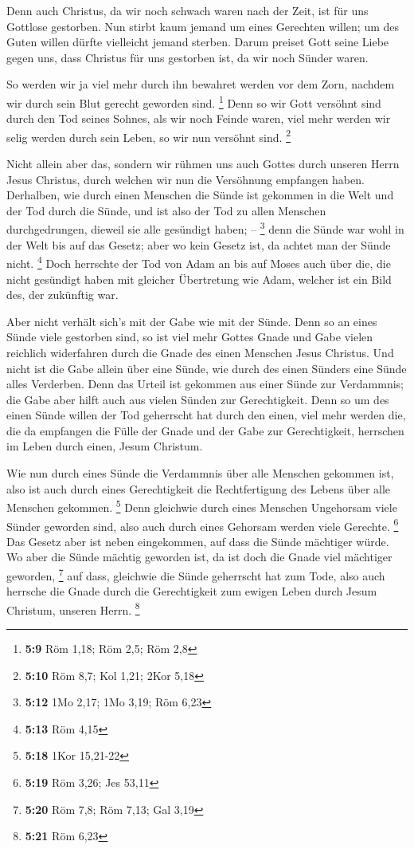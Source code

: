  Denn auch Christus, da wir noch schwach waren nach der
Zeit, ist für uns Gottlose gestorben.  Nun stirbt kaum
jemand um eines Gerechten willen; um des Guten willen dürfte vielleicht
jemand sterben.  Darum preiset Gott seine Liebe gegen uns,
dass Christus für uns gestorben ist, da wir noch Sünder waren.

 So werden wir ja viel mehr durch ihn bewahret werden vor
dem Zorn, nachdem wir durch sein Blut gerecht geworden sind. \footnote{\textbf{5:9}
  Röm 1,18; Röm 2,5; Röm 2,8}  Denn so wir Gott versöhnt
sind durch den Tod seines Sohnes, als wir noch Feinde waren, viel mehr
werden wir selig werden durch sein Leben, so wir nun versöhnt sind.
\footnote{\textbf{5:10} Röm 8,7; Kol 1,21; 2Kor 5,18}

 Nicht allein aber das, sondern wir rühmen uns auch Gottes
durch unseren Herrn Jesus Christus, durch welchen wir nun die Versöhnung
empfangen haben.  Derhalben, wie durch einen Menschen die
Sünde ist gekommen in die Welt und der Tod durch die Sünde, und ist also
der Tod zu allen Menschen durchgedrungen, dieweil sie alle gesündigt
haben; -- \footnote{\textbf{5:12} 1Mo 2,17; 1Mo 3,19; Röm 6,23}
 denn die Sünde war wohl in der Welt bis auf das Gesetz;
aber wo kein Gesetz ist, da achtet man der Sünde nicht. \footnote{\textbf{5:13}
  Röm 4,15}  Doch herrschte der Tod von Adam an bis auf
Moses auch über die, die nicht gesündigt haben mit gleicher Übertretung
wie Adam, welcher ist ein Bild des, der zukünftig war.

 Aber nicht verhält sich's mit der Gabe wie mit der Sünde.
Denn so an eines Sünde viele gestorben sind, so ist viel mehr Gottes
Gnade und Gabe vielen reichlich widerfahren durch die Gnade des einen
Menschen Jesus Christus.  Und nicht ist die Gabe allein
über eine Sünde, wie durch des einen Sünders eine Sünde alles Verderben.
Denn das Urteil ist gekommen aus einer Sünde zur Verdammnis; die Gabe
aber hilft auch aus vielen Sünden zur Gerechtigkeit.  Denn
so um des einen Sünde willen der Tod geherrscht hat durch den einen,
viel mehr werden die, die da empfangen die Fülle der Gnade und der Gabe
zur Gerechtigkeit, herrschen im Leben durch einen, Jesum Christum.

 Wie nun durch eines Sünde die Verdammnis über alle
Menschen gekommen ist, also ist auch durch eines Gerechtigkeit die
Rechtfertigung des Lebens über alle Menschen gekommen. \footnote{\textbf{5:18}
  1Kor 15,21-22}  Denn gleichwie durch eines Menschen
Ungehorsam viele Sünder geworden sind, also auch durch eines Gehorsam
werden viele Gerechte. \footnote{\textbf{5:19} Röm 3,26; Jes 53,11}
 Das Gesetz aber ist neben eingekommen, auf dass die Sünde
mächtiger würde. Wo aber die Sünde mächtig geworden ist, da ist doch die
Gnade viel mächtiger geworden, \footnote{\textbf{5:20} Röm 7,8; Röm
  7,13; Gal 3,19}  auf dass, gleichwie die Sünde geherrscht
hat zum Tode, also auch herrsche die Gnade durch die Gerechtigkeit zum
ewigen Leben durch Jesum Christum, unseren Herrn. \footnote{\textbf{5:21}
  Röm 6,23}

